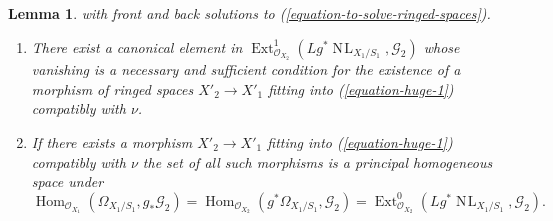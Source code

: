 \documentclass[10pt,a4paper]{amsart}
\theoremstyle{plain}
\newtheorem{lemma}[subsection]{Lemma}
\theoremstyle{definition}
\theoremstyle{remark}
\numberwithin{equation}{subsection}
\def\Hom{\mathop{\mathrm{Hom}}\nolimits}
\def\Ext{\mathop{\mathrm{Ext}}\nolimits}
\def\NL{\mathop{N\!L}\nolimits}
\begin{document}
\begin{lemma}
with front and back solutions to (\ref{equation-to-solve-ringed-spaces}).
\begin{enumerate}
\item There exist a canonical element in
$\Ext^1_{\mathcal{O}_{X_2}}(Lg^*\NL_{X_1/S_1}, \mathcal{G}_2)$
whose vanishing is a necessary and sufficient condition for the existence
of a morphism of ringed spaces $X'_2 \to X'_1$ fitting into
(\ref{equation-huge-1}) compatibly with $\nu$.
\item If there exists a morphism $X'_2 \to X'_1$ fitting into
(\ref{equation-huge-1}) compatibly with $\nu$ the set of all such morphisms
is a principal homogeneous space under
$$
\Hom_{\mathcal{O}_{X_1}}(\Omega_{X_1/S_1}, g_*\mathcal{G}_2) =
\Hom_{\mathcal{O}_{X_2}}(g^*\Omega_{X_1/S_1}, \mathcal{G}_2) =
\Ext^0_{\mathcal{O}_{X_2}}(Lg^*\NL_{X_1/S_1}, \mathcal{G}_2).
$$
\end{enumerate}
\end{lemma}
\end{document}
